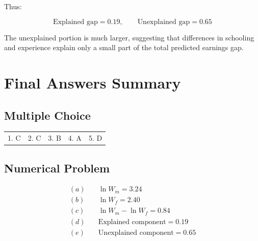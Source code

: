\documentclass[12pt]{article}
\begin{document}
Thus:

\[
\boxed{\text{Explained gap} = 0.19, \qquad \text{Unexplained gap} = 0.65}
\]

The unexplained portion is much larger, suggesting that differences in schooling and experience explain only a small part of the total predicted earnings gap.

\vspace{1em}
\newpage
\section*{Final Answers Summary}

\subsection*{Multiple Choice}
\begin{center}
\begin{tabular}{ccccc}
1. C & 2. C & 3. B & 4. A & 5. D
\end{tabular}
\end{center}

\subsection*{Numerical Problem}
\begin{align*}
(a)\quad & \ln W_m = 3.24 \\
(b)\quad & \ln W_f = 2.40 \\
(c)\quad & \ln W_m - \ln W_f = 0.84 \\
(d)\quad & \text{Explained component} = 0.19 \\
(e)\quad & \text{Unexplained component} = 0.65
\end{align*}
\end{document}
